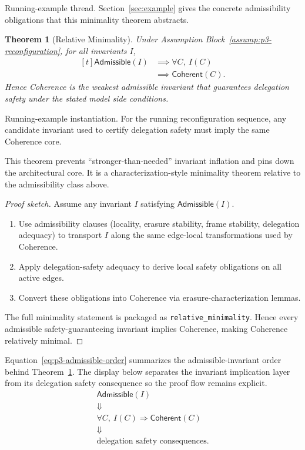 \documentclass[a4paper,10pt,twocolumn,english]{article}
\numberwithin{equation}{section}
\theoremstyle{paperdef}
\theoremstyle{paperplain}
\newtheorem{theorem}[definition]{Theorem}
\theoremstyle{paperdef}
\theoremstyle{paperremark}
\theoremstyle{paperdef}
\newcommand{\Coherent}{\ensuremath{\mathsf{Coherent}}}
\newcommand{\Admissible}{\ensuremath{\mathsf{Admissible}}}
\begin{document}
Running-example thread. Section~\ref{sec:example} gives the concrete
admissibility obligations that this minimality theorem abstracts.

\begin{theorem}[Relative Minimality]
	\label{thm:minimality}
	Under Assumption Block~\ref{assump:p3-reconfiguration}, for all invariants $I$,
	\begin{equation}
		\begin{aligned}[t]
			\Admissible(I)
			 & \implies \forall C,\ I(C) \\
			 & \implies \Coherent(C).
		\end{aligned}
	\end{equation}
	Hence Coherence is the weakest admissible invariant that guarantees delegation safety under the stated model side conditions.
\end{theorem}

Running-example instantiation. For the running reconfiguration sequence, any
candidate invariant used to certify delegation safety must imply the same
Coherence core.

This theorem prevents ``stronger-than-needed'' invariant inflation and pins down the architectural core.
It is a characterization-style minimality theorem relative to the admissibility class above.

\begin{proof}[Proof sketch]
	Assume any invariant $I$ satisfying $\Admissible(I)$.

	\begin{enumerate}
		\item Use admissibility clauses (locality, erasure stability, frame stability, delegation adequacy) to transport $I$ along the same edge-local transformations used by Coherence.
		\item Apply delegation-safety adequacy to derive local safety obligations on all active edges.
		\item Convert these obligations into Coherence via erasure-characterization lemmas.
	\end{enumerate}

	The full minimality statement is packaged as \nolinkurl{relative_minimality}. Hence every admissible safety-guaranteeing invariant implies Coherence, making Coherence relatively minimal.
\end{proof}

Equation~\ref{eq:p3-admissible-order} summarizes the admissible-invariant order behind Theorem~\ref{thm:minimality}.
The display below separates the invariant implication layer from its delegation
safety consequence so the proof flow remains explicit.
\begin{equation}
	\label{eq:p3-admissible-order}
	\begin{array}{c}
		\Admissible(I)
		\\
		\Downarrow
		\\
		\forall C,\ I(C)\Rightarrow \Coherent(C)
		\\
		\Downarrow
		\\
		\text{delegation safety consequences}.
	\end{array}
\end{equation}
\end{document}

